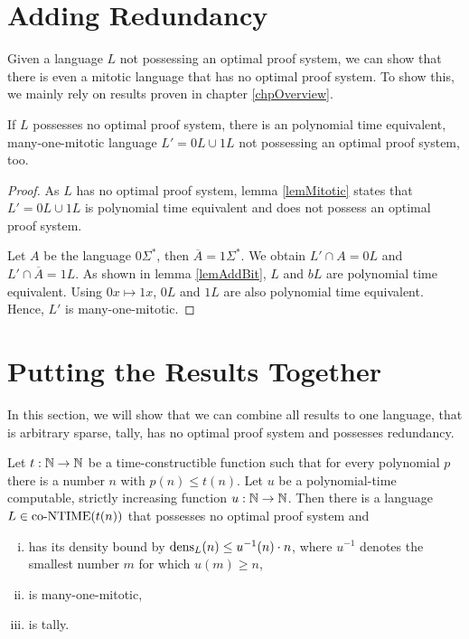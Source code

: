   \section{Adding Redundancy}

  Given a language \(L\) not possessing an optimal proof system, we can show that there is even a mitotic language that has no optimal proof system. To show this, we mainly rely on results proven in chapter \ref{chpOverview}.

  \begin{theorem} \label{thmMitotic}
    If \(L\) possesses no optimal proof system, there is an polynomial time equivalent, many-one-mitotic language \(L' = 0L \cup 1L\) not possessing an optimal proof system, too.
  \end{theorem}

  \begin{proof}
    As \(L\) has no optimal proof system, lemma \ref{lemMitotic} states that \(L' = 0L \cup 1L\) is polynomial time equivalent and does not possess an optimal proof system.

    Let \(A\) be the language \(0\Sigma^*\), then \(\overline{A} = 1\Sigma^*\). We obtain \(L' \cap A = 0L\) and \(L' \cap \overline{A} = 1L\). As shown in lemma \ref{lemAddBit}, \(L\) and \(bL\) are polynomial time equivalent. Using \(0x \mapsto 1x\), \(0L\) and \(1L\) are also polynomial time equivalent. Hence, \(L'\) is many-one-mitotic.
  \end{proof}
  
  
  \section{Putting the Results Together}
  
  In this section, we will show that we can combine all results to one language, that is arbitrary sparse, tally, has no optimal proof system and possesses redundancy.
  
  \begin{corollary}
    Let \(t:\mathbb{N}\to\mathbb{N}\) be a time-constructible function such that for every polynomial \(p\) there is a number \(n\) with \(p(n) \leq t(n)\). Let \(u\) be a polynomial-time computable, strictly increasing function \(u:\mathbb{N}\to\mathbb{N}\). Then there is a language \(L \in \text{co-NTIME}(t(n))\) that possesses no optimal proof system and 
    \begin{enumerate}[(i)]
     \item has its density bound by \(\operatorname{dens}_L(n) \leq u^{-1}(n) \cdot n\), where \(u^{-1}\) denotes the smallest number \(m\) for which \(u(m) \geq n\),
     \item is many-one-mitotic,
     \item is tally.
    \end{enumerate}
  \end{corollary}
  
